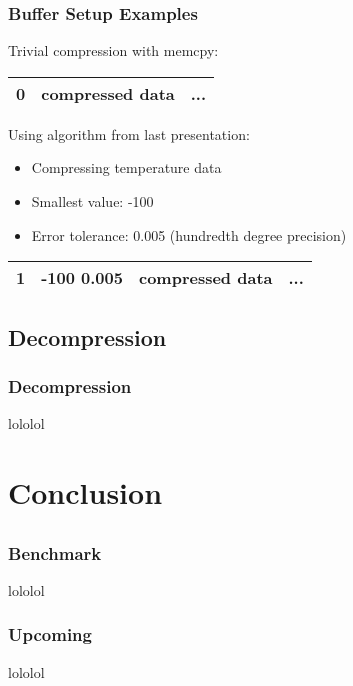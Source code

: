 \documentclass[compress]{beamer}
\begin{document}
\begin{frame}
	\frametitle{Buffer Setup Examples}

	Trivial compression with memcpy:\\
	\begin{center}
	\begin{tabular}{|c||cc|}
		\hline
		0 & compressed data & ... \\
		\hline
	\end{tabular}
	\end{center}

	\bigskip
	\pause

	Using algorithm from last presentation:\\
	\begin{itemize}
		\item Compressing temperature data
		\item Smallest value: -100
		\item Error tolerance: 0.005 (hundredth degree precision)
	\end{itemize}
	\begin{center}
	\begin{tabular}{|c|c|cc|}
		\hline
		1 & -100 0.005 & compressed data & ... \\
		\hline
	\end{tabular}
	\end{center}

\end{frame}

\subsection{Decompression}

\begin{frame}
	\frametitle{Decompression}

	lololol
\end{frame}

\section{Conclusion}
\subsection*{}

\begin{frame}
	\frametitle{Benchmark}

	lololol
\end{frame}

\begin{frame}
	\frametitle{Upcoming}

	lololol
\end{frame}
\end{document}
